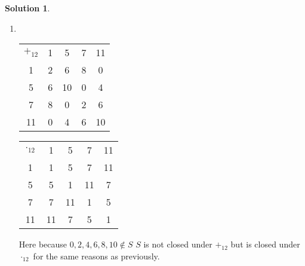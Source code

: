 \documentclass[10pt]{article}
\theoremstyle{definition}
\newtheorem{soln}{Solution}
\begin{document}
\begin{soln}
\begin{enumerate}[label=(\alph*)]
    \item ~\begin{center}
            \setlength\extrarowheight{3pt}
            \noindent\begin{tabular}{c | c c c c}
              $+_{12}$ & 1 & 5  & 7 & 11 \\
              \cline{1-5}
              1        & 2 & 6  & 8 & 0  \\
              5        & 6 & 10 & 0 & 4  \\
              7        & 8 & 0  & 2 & 6  \\
              11       & 0 & 4  & 6 & 10 \\
            \end{tabular}
            \qquad
            \noindent\begin{tabular}{c | c c c c}
              $\cdot_{12}$ & 1  & 5  & 7  & 11 \\
              \cline{1-5}
              1            & 1  & 5  & 7  & 11 \\
              5            & 5  & 1  & 11 & 7  \\
              7            & 7  & 11 & 1  & 5  \\
              11           & 11 & 7  & 5  & 1  \\
            \end{tabular}
          \end{center}
          Here because $0,2,4,6,8,10\notin S$ $S$ is not closed under $+_12$ but is closed under $\cdot_12$ for the same reasons as previously.
  \end{enumerate}
\end{soln}
\end{document}
